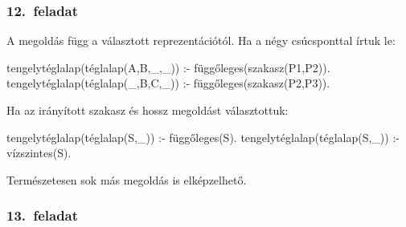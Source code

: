 \subsubsection*{12.~feladat}
A megoldás függ a választott reprezentációtól.
Ha a négy csúcsponttal
írtuk le:
\begin{program}
tengelytéglalap(téglalap(A,B,_,_)) :-
    függőleges(szakasz(P1,P2)).
tengelytéglalap(téglalap(_,B,C,_)) :-
    függőleges(szakasz(P2,P3)).
\end{program}
Ha az irányított szakasz és hossz megoldást
választottuk:
\begin{program}
tengelytéglalap(téglalap(S,_)) :- függőleges(S).
tengelytéglalap(téglalap(S,_)) :- vízszintes(S).
\end{program}
Természetesen sok más megoldás is elképzelhető.
\subsubsection*{13.~feladat}

